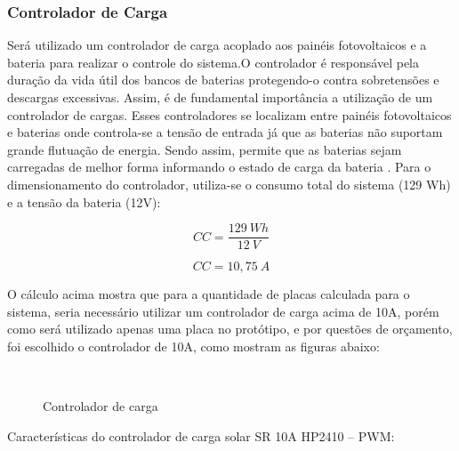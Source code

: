 \subsubsection{Controlador de Carga}
Será utilizado um controlador de carga acoplado aos painéis
fotovoltaicos e a bateria para realizar o controle do sistema.O controlador é responsável pela duração da vida útil dos bancos de baterias protegendo-o contra sobretensões e descargas excessivas. Assim, é de fundamental importância a utilização de um controlador de cargas. Esses controladores se localizam entre painéis fotovoltaicos e baterias onde controla-se a tensão de entrada já que as baterias não suportam grande flutuação de energia. Sendo assim, permite que as baterias sejam carregadas de melhor forma informando o estado de carga da bateria \cite{serrao2010dimensionamento}.
Para o dimensionamento do controlador, utiliza-se o consumo total do sistema (129 Wh) e a tensão da bateria (12V):

\begin{equation}
CC=\frac{129~Wh}{12~V}
\end{equation}

\begin{equation}
CC=10,75~A
\end{equation}

O cálculo acima mostra que para a quantidade de placas calculada para o sistema, seria necessário utilizar um controlador de carga acima de 10A, porém como será utilizado apenas uma placa no protótipo, e por questões de orçamento, foi escolhido o controlador de 10A, como mostram as figuras abaixo:

\begin{figure}[!htb]
\centering
    \qquad
    \\

   \caption{Controlador de carga}
\label{figuras1}
\end{figure}


    Características do controlador de carga solar SR 10A HP2410 – PWM:

